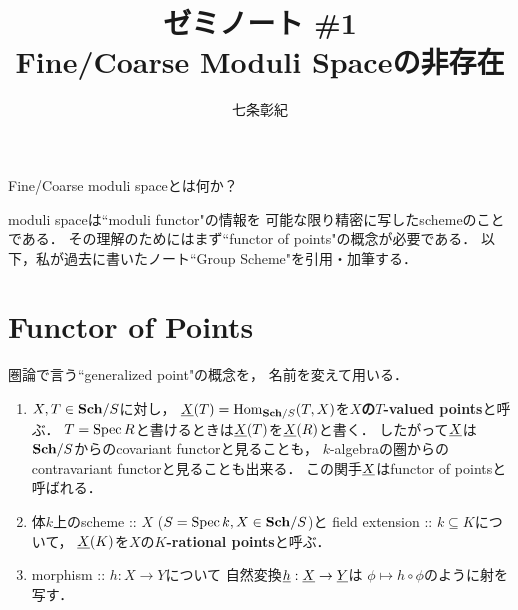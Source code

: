 \documentclass[a4paper]{jsarticle}
\begin{document}
\title{ゼミノート \#1 \\ Fine/Coarse Moduli Spaceの非存在}
\author{七条彰紀}
\maketitle

\begin{question}
    Fine/Coarse moduli spaceとは何か？
\end{question}
moduli spaceは``moduli functor"の情報を
可能な限り精密に写したschemeのことである．
その理解のためにはまず``functor of points"の概念が必要である．
以下，私が過去に書いたノート``Group Scheme"を引用・加筆する．

\section{Functor of Points}
    圏論で言う``generalized point"の概念を，
    名前を変えて用いる．

    \begin{Def}
    \enumfix
    \begin{enumerate}[label=(\roman*),leftmargin=*]
    \item 
    $X, T \in \mathbf{Sch}/S$に対し，
    $\underline{X}(T)=\operatorname{Hom}_{\mathbf{Sch}/S}(T,X)$を\textbf{$X$の$T$-valued points}と呼ぶ．
    $T=\operatorname{Spec} R$と書けるときは$\underline{X}(T)$を$\underline{X}(R)$と書く．
    したがって$\underline{X}$は$\mathbf{Sch}/S$からのcovariant functorと見ることも，
    $k$-algebraの圏からのcontravariant functorと見ることも出来る．
    この関手$\underline{X}$はfunctor of pointsと呼ばれる．

    \item
    体$k$上のscheme :: $X$ ($S=\operatorname{Spec} k, X \in \mathbf{Sch}/S$)と
    field extension :: $k \subseteq K$について，
    $\underline{X}(K)$を$X$の\textbf{$K$-rational points}と呼ぶ．

    \item
    morphism :: $h: X \to Y$について
    自然変換$\underline{h}: \underline{X} \to \underline{Y}$は
    $\phi \mapsto h \circ \phi$のように射を写す．
    \end{enumerate}
    \end{Def}
\end{document}
